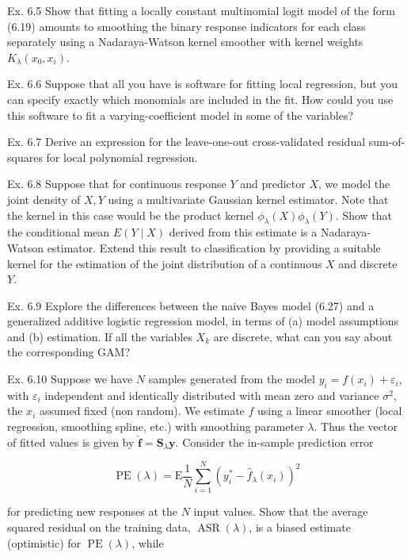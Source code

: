 \documentclass[10pt]{article}
\begin{document}
Ex. 6.5 Show that fitting a locally constant multinomial logit model of the form (6.19) amounts to smoothing the binary response indicators for each class separately using a Nadaraya-Watson kernel smoother with kernel weights $K_{\lambda}\left(x_{0}, x_{i}\right)$.

Ex. 6.6 Suppose that all you have is software for fitting local regression, but you can specify exactly which monomials are included in the fit. How could you use this software to fit a varying-coefficient model in some of the variables?

Ex. 6.7 Derive an expression for the leave-one-out cross-validated residual sum-of-squares for local polynomial regression.

Ex. 6.8 Suppose that for continuous response $Y$ and predictor $X$, we model the joint density of $X, Y$ using a multivariate Gaussian kernel estimator. Note that the kernel in this case would be the product kernel $\phi_{\lambda}(X) \phi_{\lambda}(Y)$. Show that the conditional mean $E(Y \mid X)$ derived from this estimate is a Nadaraya-Watson estimator. Extend this result to classification by providing a suitable kernel for the estimation of the joint distribution of a continuous $X$ and discrete $Y$.

Ex. 6.9 Explore the differences between the naive Bayes model (6.27) and a generalized additive logistic regression model, in terms of (a) model assumptions and (b) estimation. If all the variables $X_{k}$ are discrete, what can you say about the corresponding GAM?

Ex. 6.10 Suppose we have $N$ samples generated from the model $y_{i}=f\left(x_{i}\right)+ \varepsilon_{i}$, with $\varepsilon_{i}$ independent and identically distributed with mean zero and variance $\sigma^{2}$, the $x_{i}$ assumed fixed (non random). We estimate $f$ using a linear smoother (local regression, smoothing spline, etc.) with smoothing parameter $\lambda$. Thus the vector of fitted values is given by $\hat{\mathbf{f}}=\mathbf{S}_{\lambda} \mathbf{y}$. Consider the in-sample prediction error


\begin{equation*}
\operatorname{PE}(\lambda)=\mathrm{E} \frac{1}{N} \sum_{i=1}^{N}\left(y_{i}^{*}-\hat{f}_{\lambda}\left(x_{i}\right)\right)^{2} \tag{6.34}
\end{equation*}


for predicting new responses at the $N$ input values. Show that the average squared residual on the training data, $\operatorname{ASR}(\lambda)$, is a biased estimate (optimistic) for $\operatorname{PE}(\lambda)$, while
\end{document}

